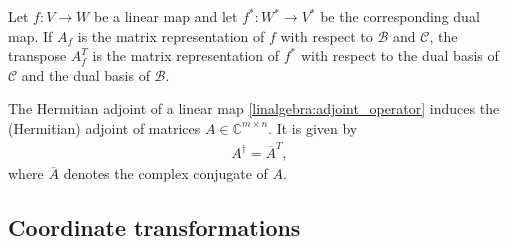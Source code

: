     \begin{property}[Transpose]
        Let $f:V\rightarrow W$ be a linear map and let $f^*:W^*\rightarrow V^*$ be the corresponding dual map. If $A_f$ is the matrix representation of $f$ with respect to $\mathcal{B}$ and $\mathcal{C}$, the transpose $A_f^T$ is the matrix representation of $f^*$ with respect to the dual basis of $\mathcal{C}$ and the dual basis of $\mathcal{B}$.
    \end{property}
    \begin{result}
        The Hermitian adjoint of a linear map \ref{linalgebra:adjoint_operator} induces the (Hermitian) adjoint of matrices $A\in\mathbb{C}^{m\times n}$. It is given by
        \begin{gather}
            A^\dag = \overline{A}^T,
        \end{gather}
        where $\overline{A}$ denotes the complex conjugate of $A$.
    \end{result}

\subsection{Coordinate transformations}


